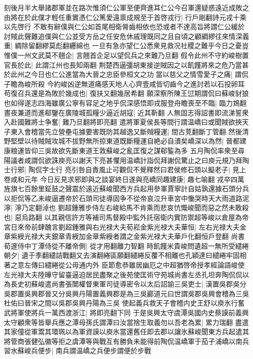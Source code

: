 刻後月半大舉諸郡軍並在路次惟須仁公軍至便齊進耳仁公今召軍還疑惑遠近成敗之由將在於此僕才輕任重實憑仁公篤愛遠禀成規至于首啓戎行|{
	行戶剛翻詩元戎十乘以先啓行}
不敢有辭僕與仁公如首尾相衛脣齒相依也恐或者不達高旨將謂仁公緩於討賊此聲難追僕與仁公並受方岳之任安危休戚理既同之且自頃之顧綢繆往來情深義重|{
	綢除留翻繆莫彪翻纒綿也}
一旦有急亦望仁公悉衆見救况社稷之難乎今日之憂豈惟僕一州文武莫不翹企|{
	言翹首企足以望侃兵之來難乃旦翻}
假令此州不守約峻樹置官長於此|{
	此謂江州也長知兩翻}
荆楚西逼彊胡東接逆賊因之以飢饉將來之危乃當甚於此州之今日也仁公進當為大晉之忠臣參桓文之功當以慈父之情雪愛子之痛|{
	謂侃子瞻為峻所殺}
今約峻凶逆無道痛感天地人心齊壹咸皆切齒今之進討若以石投卵耳苟復召兵還是為敗於幾成也|{
	復扶又翻幾居希翻}
願深察所陳王愆期謂侃曰蘇峻豺狼也如得遂志四海雖廣公寧有容足之地乎侃深感悟即戎服登舟瞻喪至不臨|{
	臨力鴆翻}
晝夜兼道而進郗鑒在廣陵城孤糧少逼近胡寇|{
	近其靳翻}
人無固志得詔書即流涕誓衆入赴國難將士争奮|{
	難乃旦翻將即亮翻}
遣將軍夏侯長等間行謂温嶠曰或聞賊欲挾天子東入會稽當先立營壘屯據要害既防其越逸又斷賊糧運|{
	間古莧翻斷丁管翻}
然後清野堅壁以待賊賊攻城不拔野無所掠東道既斷糧運自絶必自潰矣嶠深以為然|{
	晉都建康粮運皆仰三吳故欲先斷東道王敦蘇峻之亂匡復之謀郗鍳為多}
五月陶侃率衆至尋陽議者咸謂侃欲誅庾亮以謝天下亮甚懼用温嶠計詣侃拜謝侃驚止之曰庾元規乃拜陶士行邪|{
	陶侃字士行}
亮引咎自責風止可觀侃不覺釋然曰君侯修石頭以擬老子|{
	見上卷咸和元年}
今日反見求邪即與之談宴終日遂與亮嶠同趣建康|{
	趣七喻翻}
戎卒四萬旌旗七百餘里鉦鼓之聲震於遠近蘇峻聞西方兵起用參軍賈寧計自姑孰還據石頭分兵以拒侃等乙未峻逼遷帝於石頭司徒導固争不從帝哀泣升車宮中慟哭時天大雨道路泥濘|{
	濘乃定翻淖也}
劉超鍾雅步侍左右峻給馬不肯乘而悲哀忼慨峻聞而惡之然未敢殺也|{
	惡烏路翻}
以其親信許方等補司馬督殿中監外託宿衛内實防禦超等峻以倉屋為帝宮日來帝前肆醜言劉超鍾雅與右光禄大夫荀崧金紫光禄大夫華恒|{
	左右光禄大夫金章紫綬光禄大夫銀章青綬加金章紫綬者謂之金紫光禄大夫華戶化翻恒戶登翻}
尚書荀邃侍中丁潭侍從不離帝側|{
	從才用翻離力智翻}
時飢饉米貴峻問遺超一無所受繾綣朝夕|{
	遺于季翻繾詰戰翻又去演翻綣區願翻繾綣反覆不相離也孔穎達曰繾綣牢固相著之意左傳曰繾綣從公毋通内外}
臣節愈恭雖居幽厄之中超猶啓帝授孝經論語峻使左光禄大夫陸曄守留臺逼迫居民盡聚之後苑使匡術守苑城尚書左丞孔坦奔陶侃侃以為長史初蘇峻遣尚書張闓權督東軍司徒導密令以太后詔諭三吳吏士|{
	漢置吳郡吳分吳郡置吳興郡晉又分吳興丹陽置義興郡是為三吳酈道元曰世謂吳郡吳興會稽為三吳杜佑曰晉宋之間以吳郡吳興丹陽為三吳}
使起義兵救天子會稽内史王舒以庾氷行奮武將軍使將兵一萬西渡浙江|{
	將即亮翻下同}
于是吳興太守虞潭吳國内史蔡謨前義興太守顧衆等皆舉兵應之潭母孫氏謂潭曰汝當捨生取義勿以吾老為累|{
	累力瑞翻}
盡遣其家僮從軍鬻其環珮以為軍資謨以庾氷當還舊任即去郡以讓氷蘇峻聞東方兵起遣其將管商張健弘徽等拒之虞潭等與戰互有勝負未能得前陶侃温嶠軍于茄子浦嶠以南兵習水蘇峻兵便步|{
	南兵謂温嶠之兵便步謂便於步戰}
